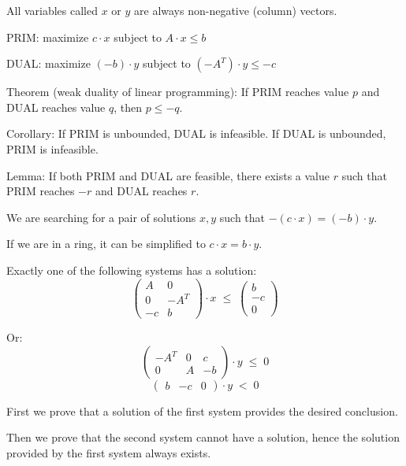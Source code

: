 \documentclass[]{article}
\begin{document}
	

All variables called $x$ or $y$ are always non-negative (column) vectors.

PRIM:
maximize $c \cdot x$ subject to $A \cdot x \le b$

DUAL:
maximize $(-b) \cdot y$ subject to $(-A^T) \cdot y \le -c$

Theorem (weak duality of linear programming):
If PRIM reaches value $p$ and DUAL reaches value $q$, then
$p \le -q$.

Corollary:
If PRIM is unbounded, DUAL is infeasible.
If DUAL is unbounded, PRIM is infeasible.
\bigskip

Lemma:
If both PRIM and DUAL are feasible, there exists a value $r$ such that
PRIM reaches $-r$ and DUAL reaches $r$.

We are searching for a pair of solutions $x, y$ such that
$-(c \cdot x) = (-b) \cdot y$.

If we are in a ring, it can be simplified to $c \cdot x = b \cdot y$.

Exactly one of the following systems has a solution:
$$
\begin{pmatrix}
	A & 0 \\
	0 & -A^T \\
	-c & b
\end{pmatrix}
\cdot x
\;\le\;
\begin{pmatrix}
	b \\
	-c \\
	0
\end{pmatrix}
$$

Or:
$$
\begin{pmatrix}
	-A^T & 0 & c \\
	0 & A & -b
\end{pmatrix}
\cdot y
\;\le\;
0
$$
$$
\begin{pmatrix}
	b & -c & 0
\end{pmatrix}
\cdot y
\;<\;
0
$$

First we prove that a solution of the first system provides the desired conclusion.

Then we prove that the second system cannot have a solution,
hence the solution provided by the first system always exists.
\end{document}
